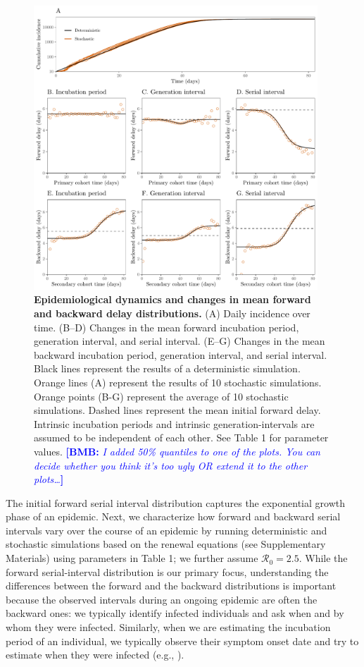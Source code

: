 \documentclass[12pt]{article}
\newcommand{\comment}{\showcomment}
\newcommand{\showcomment}[3]{\textcolor{#1}{\textbf{[#2: }\textsl{#3}\textbf{]}}}
\newcommand{\bmb}[1]{\comment{blue}{BMB}{#1}}
\newcommand{\Rx}[1]{\ensuremath{{\mathcal R}_{#1}}\xspace}
\newcommand{\Ro}{\Rx{0}}
\begin{document}
\begin{figure}[!ht]
\begin{center}
\includegraphics[width=0.95\textwidth]{forward.pdf}
\caption{
\textbf{Epidemiological dynamics and changes in mean forward and backward delay distributions.}
(A) Daily incidence over time.
(B--D) Changes in the mean forward incubation period, generation interval, and serial interval.
(E--G) Changes in the mean backward incubation period, generation interval, and serial interval.
Black lines represent the results of a deterministic simulation.
Orange lines (A) represent the results of 10 stochastic simulations.
Orange points (B-G) represent the average of 10 stochastic simulations.
Dashed lines represent the mean initial forward delay.
Intrinsic incubation periods and intrinsic generation-intervals are assumed to be independent of each other.
See Table 1 for parameter values.
\bmb{I added 50\% quantiles to one of the plots.  You can decide whether you think it's too ugly OR extend it to the other plots\ldots}
}
\label{fig:epi}
\end{center}
\end{figure}

The initial forward serial interval distribution captures the exponential growth phase of an epidemic.
Next, we characterize how forward and backward serial intervals vary over the course of an epidemic by running deterministic and stochastic simulations based on the renewal equations (see Supplementary Materials) using parameters in Table 1;
we further assume $\Ro=2.5$.
While the forward serial-interval distribution is our primary focus, understanding the differences between the forward and the backward distributions is important because the observed intervals during an ongoing epidemic are often the backward ones:
we typically identify infected individuals and ask when and by whom they were infected.
Similarly, when we are estimating the incubation period of an individual, we typically observe their symptom onset date and try to estimate when they were infected (e.g., \cite{backer2020incubation}).
\end{document}
